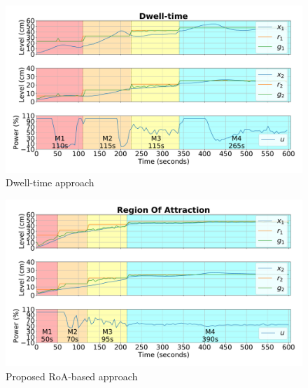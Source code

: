 \begin{figure}[ht!]
  \centering \captionsetup{justification=centering}
  \includegraphics[width=\linewidth]{imgs/tanks-dwell}
  \caption{Dwell-time approach}%
  \label{fig:tanks-dwell}
\end{figure}

\begin{figure}[ht!]
  \centering \captionsetup{justification=centering}
  \includegraphics[width=\linewidth]{imgs/tanks-roa}
  \caption{Proposed RoA-based approach}%
  \label{fig:tanks-roa}
\end{figure}
